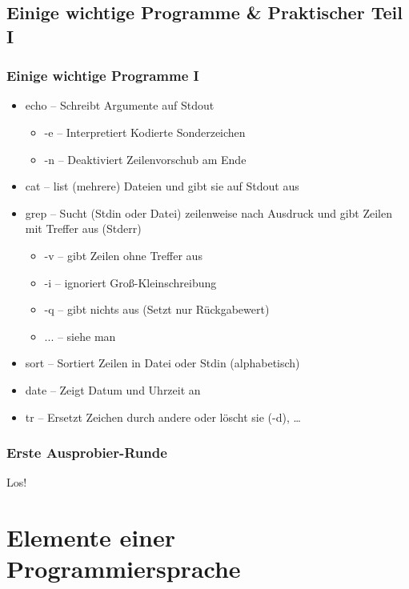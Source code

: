 \documentclass{beamer}
\begin{document}
\subsection{Einige wichtige Programme \& Praktischer Teil I}
\begin{frame}
 \frametitle{Einige wichtige Programme I}
 \begin{itemize}
   \item echo -- Schreibt Argumente auf Stdout
     \begin{itemize}
       \item -e -- Interpretiert Kodierte Sonderzeichen
       \item -n -- Deaktiviert Zeilenvorschub am Ende
     \end{itemize}
   \item cat -- list (mehrere) Dateien und gibt sie auf Stdout aus
   \item grep -- Sucht (Stdin oder Datei) zeilenweise nach Ausdruck und gibt Zeilen mit Treffer aus (Stderr)
     \begin{itemize}
       \item -v -- gibt Zeilen ohne Treffer aus
       \item -i -- ignoriert Groß-Kleinschreibung
       \item -q -- gibt nichts aus (Setzt nur Rückgabewert)
       \item ... -- siehe man
     \end{itemize}
   \item sort -- Sortiert Zeilen in Datei oder Stdin (alphabetisch)
   \item date -- Zeigt Datum und Uhrzeit an
   \item tr -- Ersetzt Zeichen durch andere oder löscht sie (-d), …
 \end{itemize}
\end{frame}

\begin{frame}
 \frametitle{Erste Ausprobier-Runde}
 \begin{center}
 Los!
 \end{center}
\end{frame}

\section{Elemente einer Programmiersprache}
\end{document}
